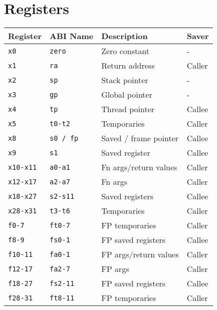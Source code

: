 \section*{Registers}

\begin{tabular} {l | l | l | l} \hline
Register     & ABI Name     & Description           & Saver  \\ \hline
\tt{x0}      & \tt{zero}    & Zero constant         & -      \\
\tt{x1}      & \tt{ra}      & Return address        & Caller \\
\tt{x2}      & \tt{sp}      & Stack pointer         & -      \\
\tt{x3}      & \tt{gp}      & Global pointer        & -      \\
\tt{x4}      & \tt{tp}      & Thread pointer        & Callee \\
\tt{x5}      & \tt{t0-t2}   & Temporaries           & Caller \\
\tt{x8}      & \tt{s0 / fp} & Saved / frame pointer & Callee \\
\tt{x9}      & \tt{s1}      & Saved register        & Callee \\
\tt{x10-x11} & \tt{a0-a1}   & Fn args/return values & Caller \\
\tt{x12-x17} & \tt{a2-a7}   & Fn args               & Caller \\
\tt{x18-x27} & \tt{s2-s11}  & Saved registers       & Callee \\
\tt{x28-x31} & \tt{t3-t6}   & Temporaries           & Caller \\ \hline
\tt{f0-7}    & \tt{ft0-7}   & FP temporaries        & Caller \\
\tt{f8-9}    & \tt{fs0-1}   & FP saved registers    & Callee \\
\tt{f10-11}  & \tt{fa0-1}   & FP args/return values & Caller \\
\tt{f12-17}  & \tt{fa2-7}   & FP args               & Caller \\
\tt{f18-27}  & \tt{fs2-11}  & FP saved registers    & Callee \\
\tt{f28-31}  & \tt{ft8-11}  & FP temporaries        & Caller \\ \hline
\end{tabular}